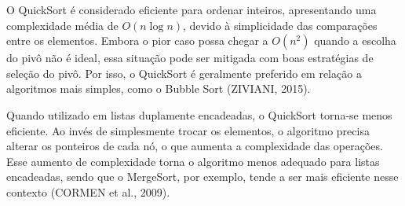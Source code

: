 \documentclass{SBCbookchapter}
\begin{document}
O QuickSort é considerado eficiente para ordenar inteiros, apresentando uma complexidade média de $ O(n\log⁡n)$, devido à simplicidade das comparações entre os elementos. Embora o pior caso possa chegar a $ O(n^2)$ quando a escolha do pivô não é ideal, essa situação pode ser mitigada com boas estratégias de seleção do pivô. Por isso, o QuickSort é geralmente preferido em relação a algoritmos mais simples, como o Bubble Sort (ZIVIANI, 2015).
\begin{table}[h]
\centering
{}
\caption{QuickSort}
\end{table}

Quando utilizado em listas duplamente encadeadas, o QuickSort torna-se menos eficiente. Ao invés de simplesmente trocar os elementos, o algoritmo precisa alterar os ponteiros de cada nó, o que aumenta a complexidade das operações. Esse aumento de complexidade torna o algoritmo menos adequado para listas encadeadas, sendo que o MergeSort, por exemplo, tende a ser mais eficiente nesse contexto (CORMEN et al., 2009).
\end{document}
